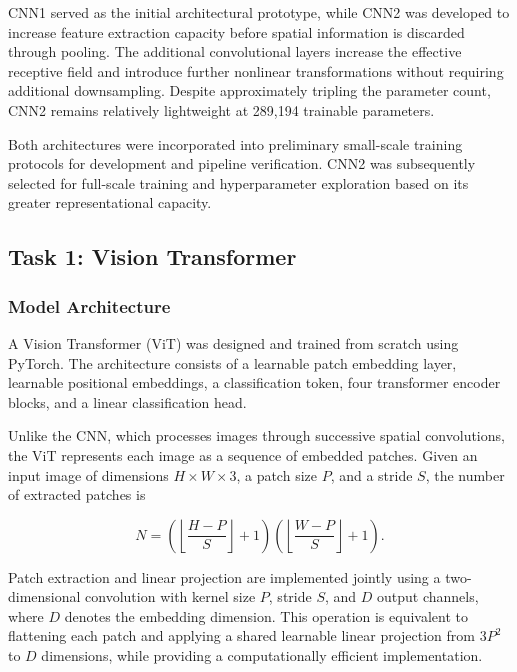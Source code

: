 \documentclass[conference]{IEEEtran}
\begin{document}
CNN1 served as the initial architectural prototype, while
CNN2 was developed to increase feature extraction capacity
before spatial information is discarded through pooling.
The additional convolutional layers increase the effective
receptive field and introduce further nonlinear
transformations without requiring additional downsampling.
Despite approximately tripling the parameter count,
CNN2 remains relatively lightweight at 289,194 trainable
parameters.

Both architectures were incorporated into preliminary
small-scale training protocols for development and
pipeline verification. CNN2 was subsequently selected
for full-scale training and hyperparameter exploration
based on its greater representational capacity.


\subsection{Task 1: Vision Transformer}
\label{sec:vit}

\subsubsection{Model Architecture}

A Vision Transformer (ViT) was designed and trained
from scratch using PyTorch. The architecture consists
of a learnable patch embedding layer, learnable
positional embeddings, a classification token, four
transformer encoder blocks, and a linear classification
head.

Unlike the CNN, which processes images through successive
spatial convolutions, the ViT represents each image as
a sequence of embedded patches. Given an input image
of dimensions $H \times W \times 3$, a patch size $P$,
and a stride $S$, the number of extracted patches is

\begin{equation}
    N =
    \left(\left\lfloor\frac{H-P}{S}\right\rfloor+1\right)
    \left(\left\lfloor\frac{W-P}{S}\right\rfloor+1\right).
\end{equation}

Patch extraction and linear projection are implemented
jointly using a two-dimensional convolution with kernel
size $P$, stride $S$, and $D$ output channels, where
$D$ denotes the embedding dimension. This operation is
equivalent to flattening each patch and applying a shared
learnable linear projection from $3P^2$ to $D$ dimensions,
while providing a computationally efficient implementation.
\end{document}
